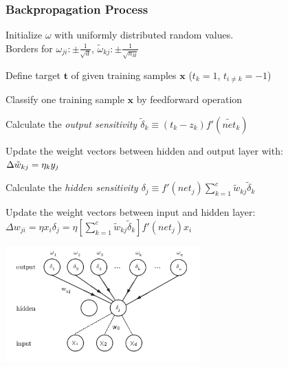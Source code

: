  \subsubsection{Backpropagation Process}
 \begin{minipage}{12cm}
 \begin{aufzaehlung}
   \item Initialize $\omega$ with uniformly distributed random values. \\
   Borders for $\omega_{ji}: \pm \frac{1}{\sqrt{d}}$, $\tilde \omega_{kj}: \pm \frac{1}{\sqrt{n_H}}$
   \item Define target $\bm t$ of given training samples $\bm x $ ($t_k=1$, $t_{i \neq k} = -1$)
   \item Classify one training sample $\bm x$ by feedforward operation
   \item Calculate the \em output sensitivity \em $\tilde{\delta}_k \equiv (t_k - z_k) f'(\tilde{net}_k)$
   \item Update the weight vectors between hidden and output layer with:\\
   $ \Delta \tilde{w}_{kj} = \eta \title{\delta}_k y_j$
   \item Calculate the \em hidden sensitivity \em $\delta_j \equiv f'(net_j) \sum_{k=1}^c \tilde{w}_{kj}\tilde{\delta}_k$
   \item Update the weight vectors between input and hidden layer:\\
   $\Delta w_{ji}= \eta x_i \delta_j = \eta \left[ \sum\limits_{k=1}^c \tilde{w}_{kj} \tilde{\delta}_k \right] f'(net_j) x_i$
 \end{aufzaehlung}
 \end{minipage}
 \begin{minipage}{7.5cm}
 \includegraphics[width=7.5cm]{./images/backpropagation.png}
 \end{minipage}\\
 
